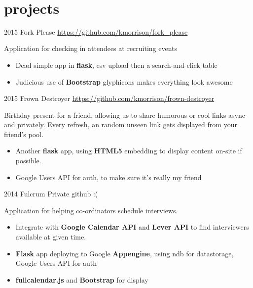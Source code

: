 \documentclass[]{friggeri-cv} %
\begin{document}
\begin{entrylist}
{\begin{itemize}
\end{itemize}}

\end{entrylist}

~
~
~
~
~
~
~
~
\pagebreak

\section{projects}

\begin{entrylist}


\entry
{2015}
{Fork Please}
{\href{https://github.com/kmorrison/fork\_please}{https://github.com/kmorrison/fork\_please}}
{
Application for checking in attendees at recruiting events
\begin{itemize}
\item Dead simple app in \textbf{flask}, csv upload then a search-and-click table
\item Judicious use of \textbf{Bootstrap} glyphicons makes everything look awesome
\end{itemize}}

\entry
{2015}
{Frown Destroyer}
{\href{https://github.com/kmorrison/frown-destroyer}{https://github.com/kmorrison/frown-destroyer}}
{
Birthday present for a friend, allowing us to share humorous or cool links async and privately. Every refresh, an random unseen link gets displayed from your friend's pool.
\begin{itemize}
\item Another \textbf{flask} app, using \textbf{HTML5} embedding to display content on-site if possible.
\item Google Users API for auth, to make sure it's really my friend
\end{itemize}}

\entry
{2014}
{Fulcrum}
{Private github :(}
{
Application for helping co-ordinators schedule interviews.
\begin{itemize}
\item Integrate with \textbf{Google Calendar API} and \textbf{Lever API} to find interviewers available at given time.
\item \textbf{Flask} app deploying to Google \textbf{Appengine}, using ndb for datastorage, Google Users API for auth
\item \textbf{fullcalendar.js} and \textbf{Bootstrap} for display
\end{itemize}}


\end{entrylist}
\end{document}
